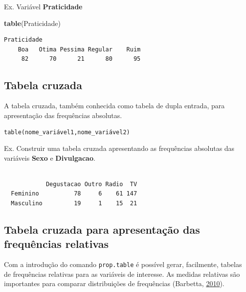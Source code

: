 \documentclass[12pt,brazil,oneside]{book}
\newenvironment{Shaded}{\begin{snugshade}}{\end{snugshade}}
\newcommand{\KeywordTok}[1]{\textcolor[rgb]{0.13,0.29,0.53}{\textbf{#1}}}
\newcommand{\NormalTok}[1]{#1}
\newcommand{\OperatorTok}[1]{\textcolor[rgb]{0.81,0.36,0.00}{\textbf{#1}}}
\begin{document}
Ex. Variável \textbf{Praticidade}

\begin{Shaded}
\begin{Highlighting}[]
\KeywordTok{table}\NormalTok{(Praticidade)}
\end{Highlighting}
\end{Shaded}

\begin{verbatim}
Praticidade
    Boa   Otima Pessima Regular    Ruim 
     82      70      21      80      95 
\end{verbatim}

\hypertarget{tabela-cruzada}{%
\subsection{Tabela cruzada}\label{tabela-cruzada}}

A tabela cruzada, também conhecida como tabela de dupla entrada, para apresentação das frequências absolutas.

\texttt{table(nome\_variável1,nome\_variável2)}

Ex. Construir uma tabela cruzada apresentando as frequências absolutas das variáveis \textbf{Sexo} e \textbf{Divulgacao}.

\begin{Shaded}
\end{Shaded}

\begin{verbatim}
           
            Degustacao Outro Radio  TV
  Feminino          78     6    61 147
  Masculino         19     1    15  21
\end{verbatim}

\hypertarget{tabela-cruzada-para-apresentacao-das-frequencias-relativas}{%
\subsection{Tabela cruzada para apresentação das frequências relativas}\label{tabela-cruzada-para-apresentacao-das-frequencias-relativas}}

Com a introdução do comando \texttt{prop.table} é possível gerar, facilmente, tabelas de frequências relativas para as variáveis de interesse. As medidas relativas são importantes para comparar distribuições de frequências (Barbetta, \protect\hyperlink{ref-barbetta1988}{2010}).
\end{document}
